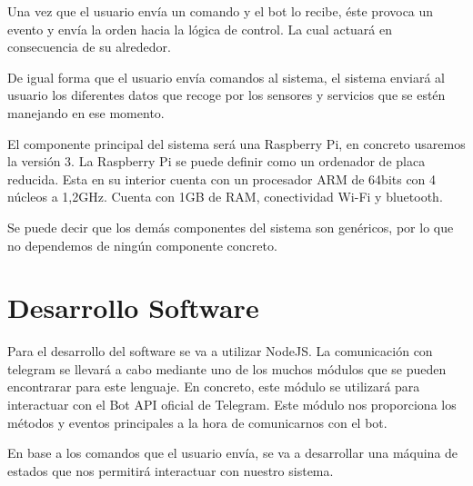 \documentclass[10pt,journal,compsoc]{IEEEtran}
\begin{document}
Una vez que el usuario envía un comando y el bot lo recibe, éste provoca un evento y envía 
la orden hacia la lógica de control. La cual actuará en consecuencia de su alrededor.

De igual forma que el usuario envía comandos al sistema, el sistema enviará al usuario los diferentes 
datos que recoge por los sensores y servicios que se estén manejando en ese momento.

El componente principal del sistema será una Raspberry Pi, en concreto usaremos 
la versión 3. La Raspberry Pi se puede definir como un ordenador de placa 
reducida. Esta en su interior cuenta con un procesador ARM de 64bits con 4 núcleos a 
1,2GHz. Cuenta con 1GB de RAM, conectividad Wi-Fi y bluetooth.

Se puede decir que los demás componentes del sistema son genéricos, por lo que 
no dependemos de ningún componente concreto.

\section{Desarrollo Software}
Para el desarrollo del software se va a utilizar NodeJS. La comunicación con telegram se llevará 
a cabo mediante uno de los muchos módulos que se pueden encontrarar para este lenguaje.
En concreto, este módulo se utilizará para interactuar con el Bot API oficial de Telegram. 
Este módulo nos proporciona los métodos y eventos principales a la hora de comunicarnos con el bot.

En base a los comandos que el usuario envía, se va a desarrollar una máquina de estados que nos 
permitirá interactuar con nuestro sistema.
\end{document}
